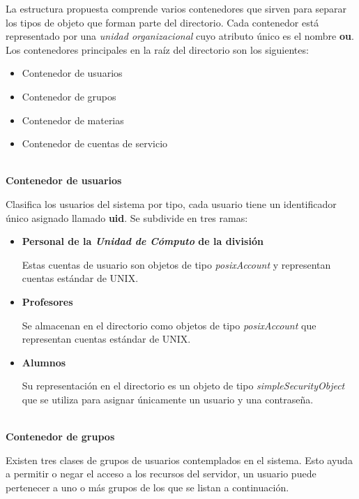 La estructura propuesta comprende varios contenedores que sirven para separar los tipos de objeto que forman parte del directorio. Cada contenedor est\'{a} representado por una \textit{unidad organizacional} cuyo atributo \'{u}nico es el nombre \textbf{ou}. Los contenedores principales en la ra\'{i}z del directorio son los siguientes:

\begin{itemize}
  \item Contenedor de usuarios
  \item Contenedor de grupos
  \item Contenedor de materias
  \item Contenedor de cuentas de servicio
\end{itemize}

\textbf{\\ Contenedor de usuarios \\}

Clasifica los usuarios del sistema por tipo, cada usuario tiene un identificador \'{u}nico asignado llamado \textbf{uid}. Se subdivide en tres ramas:

\begin{itemize}

  \item \textbf{Personal de la \textit{Unidad de C\'{o}mputo} de la divisi\'{o}n}

  Estas cuentas de usuario son objetos de tipo \textit{posixAccount} y representan cuentas est\'{a}ndar de \textsc{UNIX}.

  \item \textbf{Profesores}

  Se almacenan en el directorio como objetos de tipo \textit{posixAccount} que representan cuentas est\'{a}ndar de \textsc{UNIX}.

  \item \textbf{Alumnos}

  Su representaci\'{o}n en el directorio es un objeto de tipo \textit{simpleSecurityObject} que se utiliza para asignar \'{u}nicamente un usuario y una contrase\~{n}a.

\end{itemize}

\textbf{\\ Contenedor de grupos \\}

Existen tres clases de grupos de usuarios contemplados en el sistema. Esto ayuda a permitir o negar el acceso a los recursos del servidor, un usuario puede pertenecer a uno o m\'{a}s grupos de los que se listan a continuaci\'{o}n.

